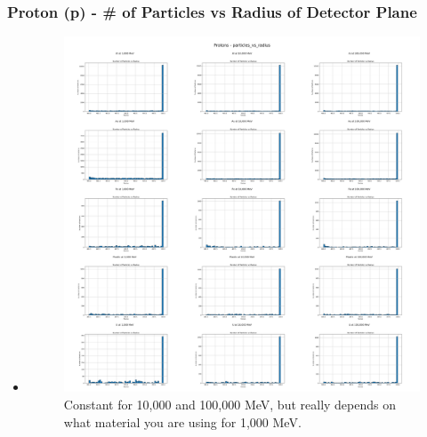 \documentclass[aspectratio-169]{beamer}
\begin{document}
\begin{frame}
\frametitle{Proton (p) - \# of Particles vs Radius of Detector Plane}
\begin{itemize}
    \item 
    \begin{minipage}{0.5\textwidth}
        \begin{figure}
            \centering
            \includegraphics[width=\textwidth]{Combined Plots/particles_vs_radius_p.png}
            \footnotesize{Constant for 10,000 and 100,000 MeV, but really depends on what material you are using for 1,000 MeV.}
        \end{figure}
    \end{minipage}
\end{itemize}
\end{frame}

\end{document}
